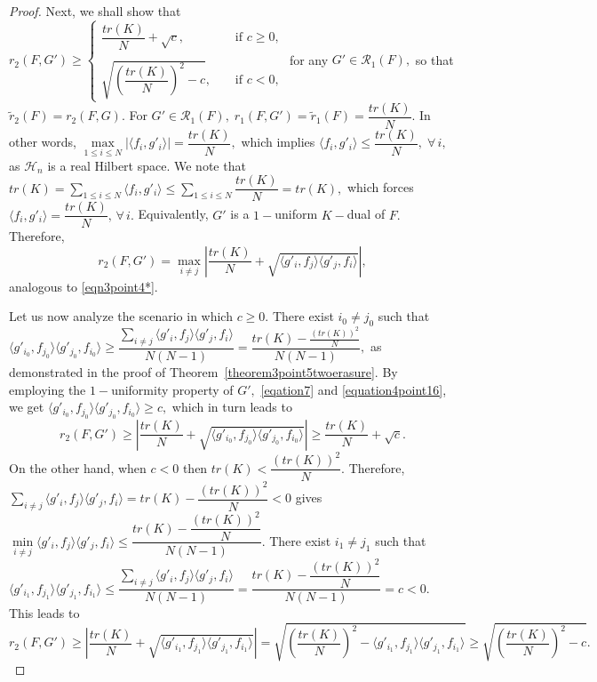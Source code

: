 \documentclass[final,1p,times]{elsarticle}
\begin{document}
\begin{proof}
		Next, we shall show that $r_{2} (F,G') \geq \begin{cases}
			\dfrac{tr(K)}{N} + \sqrt{c},\;\;  & \text{if $c \geq 0,$}\\~\\
			\sqrt{\left(\dfrac{tr(K)}{N}\right)^2 -c},\;\;\;\; & \text{if $c<0$},
		\end{cases} $
		\;\; for any $G' \in \mathcal{R}_{1}(F),$ so that  $\tilde{r}_{2} (F) =  r_{2} (F,G).$ For $G' \in \mathcal{R}_{1}(F),\; r_{1} (F,G') = \tilde{r}_{1} (F) = \dfrac{tr(K)}{N}.$ In other words, $\max\limits_{1 \leq i \leq N}  \left| \langle f_i, g'_i \rangle  \right| = \dfrac{tr(K)}{N},$ which implies $  \langle f_i, g'_i \rangle \leq \dfrac{tr(K)}{N},\;\forall\,i,$ as $\mathcal{H}_n$ is a real Hilbert space. We note that $ tr(K) = \sum\limits_{1 \leq i \leq N} \langle f_i, g'_i \rangle \leq \sum\limits_{1 \leq i \leq N} \dfrac{tr(K)}{N} = tr(K),$ which forces  $ \langle f_i, g'_i \rangle = \dfrac{tr(K)}{N}, \, \forall\,i.$ Equivalently, $G'$ is a $1-$uniform $K-$dual of $F.$ Therefore,
		$$r_{2} (F,G') = \max_{i \neq j} \left| \dfrac{tr(K)}{N}+ \sqrt{ \langle g'_i, f_j \rangle \langle g'_j, f_i \rangle}     \right|,  $$
		analogous to \eqref{eqn3point4*}.
		
		Let us now analyze the scenario in which \( c \geq 0 \). There exist $i_0 \neq j_0$ such that $ \langle g'_{i_0}, f_{j_0} \rangle \langle g'_{j_0}, f_{i_0} \rangle \geq \dfrac{\sum\limits_{i \neq j} \langle g'_i, f_j \rangle  \langle g'_j, f_i \rangle}{N(N-1)} = \dfrac{tr(K) - \frac{\left(tr(K)\right)^2}{N}}{N(N-1)},$ as demonstrated in the proof of Theorem~\ref{theorem3point5twoerasure}. By employing the \(1-\)uniformity property of $G',$ \eqref{eqation7} and   \eqref{equation4point16}, we get  $ \langle g'_{i_0}, f_{j_0} \rangle \langle g'_{j_0}, f_{i_0} \rangle \geq c,$ which in turn leads to
		$$r_{2} (F,G')  \geq \left|\frac{tr(K)}{N} + \sqrt{ \langle g'_{i_0}, f_{j_0} \rangle \langle g'_{j_0}, f_{i_0} \rangle}   \right| \geq \frac{tr(K)}{N} + \sqrt{c}. $$
		On the other hand, when $c<0$ then $tr(K) < \dfrac{\left(tr(K)\right)^2}{N}.$ Therefore, $ \sum\limits_{i \neq j}  \langle g'_i,f_j \rangle \langle g'_j,f_i \rangle = tr(K) - \dfrac{\left(tr(K)\right)^2}{N}<0$ gives $\min\limits_{i \neq j} \langle g'_i,f_j \rangle \langle g'_j,f_i \rangle \leq \dfrac{tr(K) - \dfrac{\left(tr(K)\right)^2}{N}}{N(N-1)}.$ There exist $i_1 \neq j_1$ such that $ \langle g'_{i_1}, f_{j_1} \rangle \langle g'_{j_1}, f_{i_1} \rangle \leq \dfrac{\sum\limits_{i \neq j} \langle g'_i, f_j \rangle  \langle g'_j, f_i \rangle}{N(N-1)} = \dfrac{tr(K) - \dfrac{\left(tr(K)\right)^2}{N}}{N(N-1)} = c <0.$ This leads to  
		$$r_{2} (F,G')  \geq \left|\frac{tr(K)}{N} + \sqrt{ \langle g'_{i_1}, f_{j_1} \rangle \langle g'_{j_1}, f_{i_1} \rangle}   \right| = \sqrt{\left( \frac{tr(K)}{N}\right)^2 - \langle g'_{i_1}, f_{j_1} \rangle \langle g'_{j_1}, f_{i_1} \rangle} \geq  \sqrt{\left( \frac{tr(K)}{N}\right)^2 - c}. $$
	

\end{proof}
\end{document}
